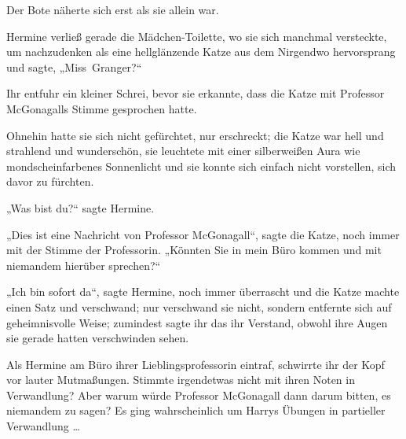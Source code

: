 
Der Bote näherte sich erst als sie allein war.

Hermine verließ gerade die Mädchen-Toilette, wo sie sich manchmal versteckte, um nachzudenken als eine hellglänzende Katze aus dem Nirgendwo hervorsprang und sagte,
„Miss~Granger?“

Ihr entfuhr ein kleiner Schrei, bevor sie erkannte, dass die Katze mit Professor McGonagalls Stimme gesprochen hatte.

Ohnehin hatte sie sich nicht gefürchtet, nur erschreckt; die Katze war hell und strahlend und wunderschön, sie leuchtete mit einer silberweißen Aura wie mondscheinfarbenes Sonnenlicht und sie konnte sich einfach nicht vorstellen, sich davor zu fürchten.

„Was bist du?“ sagte Hermine.

„Dies ist eine Nachricht von Professor McGonagall“, sagte die Katze, noch immer mit der Stimme der Professorin.
„Könnten Sie in mein Büro kommen und mit niemandem hierüber sprechen?“

„Ich bin sofort da“, sagte Hermine, noch immer überrascht und die Katze machte einen Satz und verschwand; nur verschwand sie nicht, sondern entfernte sich auf geheimnisvolle Weise; zumindest sagte ihr das ihr Verstand, obwohl ihre Augen sie gerade hatten verschwinden sehen.

Als Hermine am Büro ihrer Lieblingsprofessorin eintraf, schwirrte ihr der Kopf vor lauter Mutmaßungen. Stimmte irgendetwas nicht mit ihren Noten in Verwandlung? Aber warum würde Professor McGonagall dann darum bitten, es niemandem zu sagen? Es ging wahrscheinlich um Harrys Übungen in partieller Verwandlung …

